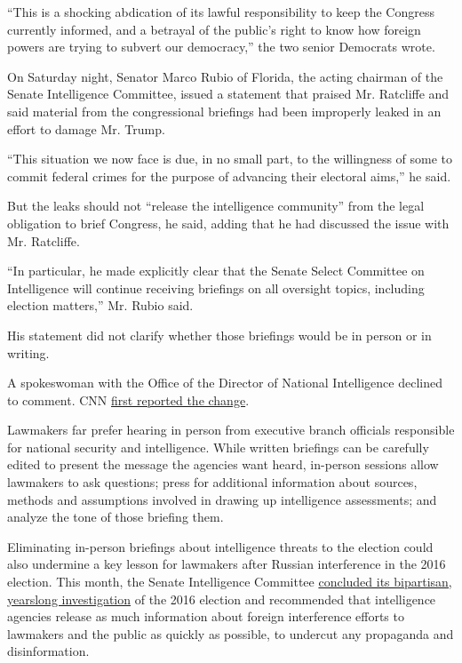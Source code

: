 ``This is a shocking abdication of its lawful responsibility to keep the
Congress currently informed, and a betrayal of the public's right to
know how foreign powers are trying to subvert our democracy,'' the two
senior Democrats wrote.

On Saturday night, Senator Marco Rubio of Florida, the acting chairman
of the Senate Intelligence Committee, issued a statement that praised
Mr. Ratcliffe and said material from the congressional briefings had
been improperly leaked in an effort to damage Mr. Trump.

``This situation we now face is due, in no small part, to the
willingness of some to commit federal crimes for the purpose of
advancing their electoral aims,'' he said.

But the leaks should not ``release the intelligence community'' from the
legal obligation to brief Congress, he said, adding that he had
discussed the issue with Mr. Ratcliffe.

``In particular, he made explicitly clear that the Senate Select
Committee on Intelligence will continue receiving briefings on all
oversight topics, including election matters,'' Mr. Rubio said.

His statement did not clarify whether those briefings would be in person
or in writing.

A spokeswoman with the Office of the Director of National Intelligence
declined to comment. CNN
\href{https://www.cnn.com/2020/08/29/politics/office-of-director-of-national-intelligence-congress-election-security/index.html}{first
reported the change}.

Lawmakers far prefer hearing in person from executive branch officials
responsible for national security and intelligence. While written
briefings can be carefully edited to present the message the agencies
want heard, in-person sessions allow lawmakers to ask questions; press
for additional information about sources, methods and assumptions
involved in drawing up intelligence assessments; and analyze the tone of
those briefing them.

Eliminating in-person briefings about intelligence threats to the
election could also undermine a key lesson for lawmakers after Russian
interference in the 2016 election. This month, the Senate Intelligence
Committee
\href{https://www.nytimes3xbfgragh.onion/2020/08/18/us/politics/senate-intelligence-russian-interference-report.html}{concluded
its bipartisan, yearslong investigation} of the 2016 election and
recommended that intelligence agencies release as much information about
foreign interference efforts to lawmakers and the public as quickly as
possible, to undercut any propaganda and disinformation.

